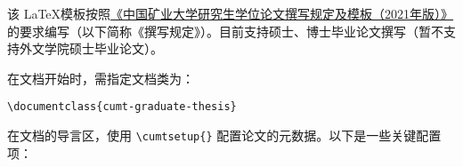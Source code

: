 
该 \LaTeX 模板按照\href{https://gs.cumt.edu.cn/info/1049/3149.htm}{《中国矿业大学研究生学位论文撰写规定及模板（2021年版）》}的要求编写（以下简称《撰写规定》）。目前支持硕士、博士毕业论文撰写（暂不支持外文学院硕士毕业论文）。

在文档开始时，需指定文档类为：
\begin{center}
    \texttt{\textbackslash documentclass\{cumt-graduate-thesis\}}
\end{center}


\label{section: metadata configuration}
在文档的导言区，使用 \texttt{\textbackslash cumtsetup\{\}} 配置论文的元数据。以下是一些关键配置项：

